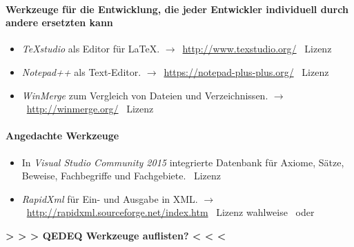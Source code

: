 \documentclass[english,ngerman,parskip=half,headsepline,footsepline]{scrreprt}
\newcounter{Enumi}
\begin{document}
	\paragraph{Werkzeuge für die Entwicklung, die jeder Entwickler individuell durch andere ersetzten kann}
	\begin{itemize}
		\setcounter{enumi}{\value{Enumi}}

		\item\label{Werkzeug:TeXstudio}\emph{\TeX studio} als Editor für \LaTeX. $\rightarrow$~\url{http://www.texstudio.org/} \textendash\ Lizenz~\cite{bib:GPLii}

		\item\label{Werkzeug:Notepadpp}\emph{Notepad++} als Text-Editor. $\rightarrow$~\url{https://notepad-plus-plus.org/} \textendash\ Lizenz~\cite{bib:GPLi}

		\item\label{Werkzeug:WinMerge}\emph{WinMerge} zum Vergleich von Dateien und Verzeichnissen. $\rightarrow$~\url{http://winmerge.org/} \textendash\ Lizenz~\cite{bib:GPLi}

		\setcounter{Enumi}{\value{enumi}}
	\end{itemize}

	\paragraph{Angedachte Werkzeuge}
	\begin{itemize}
		\setcounter{enumi}{\value{Enumi}}

		\item\label{Werkzeug:VSC DB}In \emph{Visual Studio Community 2015} integrierte Datenbank für Axiome, Sätze, Beweise, Fachbegriffe und Fachgebiete. \textendash\ Lizenz~\cite{bib:EULA}

		\item\label{Werkzeug:RapidXml}\emph{RapidXml} für Ein- und Ausgabe in XML. $\rightarrow$~\url{http://rapidxml.sourceforge.net/index.htm} \textendash\ Lizenz wahlweise~\cite{bib:BSLi} oder~\cite{bib:MIT}

	\end{itemize}

	\par \textbf{> > > QEDEQ Werkzeuge auflisten? < < <} %
\end{document}
